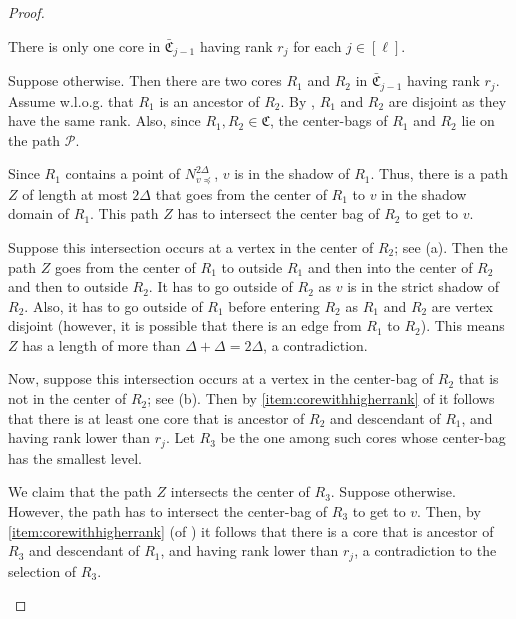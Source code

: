 \documentclass{theoretics}
\newcommand{\mP}{\mathcal{P}}
\def\core{R}
\def\C{\mathfrak{C}}
\def\barC{\bar{\C}}
\begin{document}
\begin{proof}
	\begin{claim}\label{lem:oner_j}
		There is only one core in $\barC_{j-1}$ having rank $r_j$ for each $j\in [\ell]$.
	\end{claim}
	\begin{subproof}
		Suppose otherwise. Then there are two cores $\core_1$ and $\core_2$ in $\barC_{j-1}$ having rank $r_j$. Assume w.l.o.g. that $\core_1$ is an ancestor of $\core_2$.  By ,  $\core_1$ and $\core_2$ are disjoint as they have the same rank. Also, since $\core_1,\core_2\in \C$, the center-bags of $\core_1$ and $\core_2$ lie on the path $\mP$.
		
		Since  $\core_1$ contains a point of  $N_{v\preceq}^{2\Delta}$, $v$ is in the shadow of $\core_1$. Thus, there is a path $Z$ of length at most $2 \Delta$  that goes from the center of $\core_1$ to $v$ in the shadow domain of $\core_1$. This path $Z$ has to intersect the center bag of $\core_2$ to get to $v$.
		

		Suppose this intersection occurs at a vertex in the center of $\core_2$; see (a). Then the path $Z$ goes from the center of $\core_1$ to outside $\core_1$ and then into the center of $\core_2$ and then to outside $\core_2$. It has to go outside of $\core_2$ as $v$ is in the strict shadow of $\core_2$.
		Also, it has to go outside of $\core_1$ before entering $\core_2$ as $\core_1$ and $\core_2$ are vertex disjoint (however, it is possible that there is an edge from $\core_1$ to $\core_2$).
		This means $Z$ has a length of more than $\Delta+\Delta=2\Delta$, a contradiction.
		
		Now, suppose this intersection occurs at a vertex in the center-bag of $\core_2$ that is not in the center of $\core_2$; see (b).
		Then by \cref{item:corewithhigherrank} of  it follows that there is at least one core that is ancestor of $\core_2$ and descendant of $\core_1$, and having rank lower than $r_j$. Let $\core_3$ be the one among such cores whose center-bag has the smallest level. 
		
		We claim that the path $Z$ intersects the center of $\core_3$. Suppose otherwise. However, the path has to intersect the center-bag of $\core_3$ to get to $v$.
		Then, by \cref{item:corewithhigherrank} (of ) it follows that there is a core that is ancestor of $\core_3$ and descendant of $\core_1$, and having rank lower than $r_j$, a contradiction to the selection of $\core_3$.
		

\end{subproof}
\end{proof}
\end{document}
